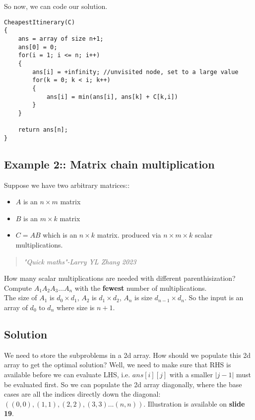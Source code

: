 \documentclass[12pt]{book}
\begin{document}
So now, we can code our solution.

\begin{lstlisting}
CheapestItinerary(C)
{
    ans = array of size n+1;
    ans[0] = 0;
    for(i = 1; i <= n; i++)
    {
        ans[i] = +infinity; //unvisited node, set to a large value
        for(k = 0; k < i; k++)
        {
            ans[i] = min(ans[i], ans[k] + C[k,i])
        }
    }

    return ans[n];
}

\end{lstlisting}
\newpage
\subsection*{Example 2:: Matrix chain multiplication}

Suppose we have two arbitrary matrices::

\begin{itemize}
    \item $A$ is an $n\times m$ matrix
    \item $B$ is an $m\times k$ matrix
    \item $C=AB$ which is an $n\times k$ matrix. produced via $n\times m\times k$ scalar multiplications.
\end{itemize}

\begin{quote}
    \textit{"Quick maths"-Larry YL Zhang 2023}
\end{quote}

How many scalar multiplications are needed with different parenthisization? Compute $A_1A_2A_3\ldots A_n$ with the \textbf{fewest} number of multiplications. \\

The size of $A_1$ is $d_0\times d_1$, $A_2$ is $d_1\times d_2$, $A_n$ is size $d_{n-1}\times d_n$. So the input is an array of $d_0$ to $d_n$ where size is $n+1$.

\subsection*{Solution}

We need to store the subproblems in a 2d array. How should we populate this 2d array to get the optimal solution? Well, we need to make sure that RHS is available before we can evaluate LHS, i.e. $ans[i][j]$ with a smaller $|j-1|$ must be evaluated first. So we can populate the 2d array diagonally, where the base cases are all the indices directly down the diagonal: $((0,0), (1,1), (2,2), (3,3)...(n,n))$. Illustration is available on \textbf{slide 19}.
\newpage
\end{document}
